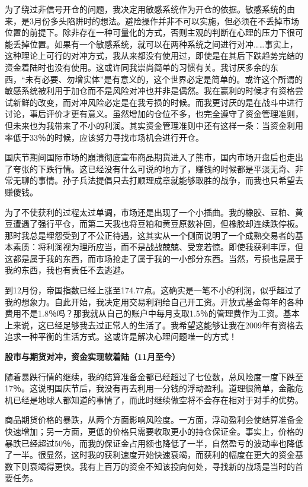 为了绕过非信号开仓的问题，我决定用敏感系统作为开仓的依据。敏感系统的由来，是3月份多头陷阱时的想法。避险操作并非不可以实施，但必须在不丢掉市场位置的前提下。除非存在一种可量化的方式，否则主观的判断在心理的压力下很可能丢掉位置。如果有一个敏感系统，就可以在两种系统之间进行对冲……事实上，这种理论上可行的对冲方式，我从来都没有使用过，即使是在其后下跌趋势完结的资金着陆时也没有使用。这或许同我崇尚简单的习惯有关。我讨厌多余的东西，“未有必要、勿增实体”是有意义的，这个世界必定是简单的。或许这个所谓的敏感系统被利用于加仓而不是风险对冲也并非是偶然。我在赢利的时候才有资格尝试新鲜的改变，而对冲风险必定是在我亏损的时候。而我更讨厌的是在战斗中进行讨论，事后评价才更有意义。虽然增加的仓位不多，也完全遵守了资金管理准则，但未来也为我带来了不小的利润。其实资金管理准则中还有这样一条：当资金利用率低于33％的时候，应该努力寻找市场机会进行开仓。

国庆节期间国际市场的崩溃彻底宣布商品期货进入了熊市，国内市场开盘后也走出了夸张的下跌行情。这已经没有什么可说的地方了，赚钱的时候都是平淡无奇、非常无聊的事情。孙子兵法提倡只去打顺理成章就能够取胜的战争，而我也只希望去赚傻钱。

为了不使获利的过程太过单调，市场还是出现了一个小插曲。我的橡胶、豆粕、黄豆遭遇了强行平仓，而第二天我也将豆粕和黄豆原数补回，但橡胶却连续跌停板。那时我总是埋怨受到了不公正待遇，这其实从一个侧面说明了一个成熟交易者的基本素质：将利润视为理所应当，而不是战战兢兢、受宠若惊。即使我获利丰厚，但这都是属于我的东西，而市场抢走了属于我的一小部分东西。当然，亏损也是属于我的东西，我也有责任不去逃避。

到12月份，帝国指数已经上涨至174.77点。这确实是一笔不小的利润，似乎超过了我的想象力。自此开始，我决定用交易利润给自己开工资。开放式基金每年的各种费用不是1.8％吗？那我就从自己的账户中每月支取1.5％的管理费作为工资。基本上来说，这已经足够我去过正常人的生活了。我希望这能够让我在2009年有资格去追求一种平衡的生活方式。这或许是解决心理问题唯一的方式！

\textbf{股市与期货对冲，资金实现软着陆（11月至今）}

随着暴跌行情的继续，我的结算准备金都已经超过了七位数，总风险度一度下跌至17％。这说明国庆节后，我没有再去利用一分钱的浮动盈利。道理很简单，金融危机已经是地球人都知道的事情了，而此时继续做空将不会存在相对于对手的优势。

商品期货价格的暴跌，从两个方面影响风险度。一方面，浮动盈利会使结算准备金快速增加；另一方面，更低的价格只需要收取更小的持仓保证金。事实上，价格的暴跌已经超过50％，而我的保证金占用额也降低了一半，自然盈亏的波动率也降低了一半。很显然，这时我的获利速度开始快速衰竭，而获利的幅度在更大的资金基数下则衰竭得更快。我有上百万的资金不知该投向何处，寻找新的战场是当时的首要任务。

